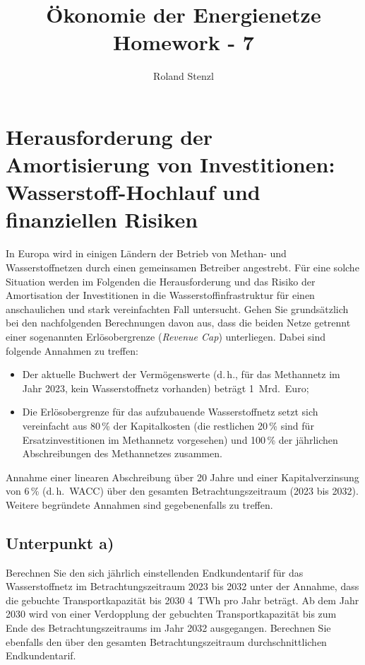 \documentclass[a4paper,12pt]{article}
\title{Ökonomie der Energienetze\\\large Homework - 7}
\author{Roland Stenzl}
\begin{document}
\maketitle

\vspace{0.5cm}

\section*{Herausforderung der Amortisierung von Investitionen:
	Wasserstoff-Hochlauf und finanziellen Risiken}


\begin{angabebox}
	In Europa wird in einigen Ländern der Betrieb von Methan- und Wasserstoffnetzen durch einen gemeinsamen Betreiber angestrebt. Für eine solche Situation werden im Folgenden die Herausforderung und das Risiko der Amortisation der Investitionen in die Wasserstoffinfrastruktur für einen anschaulichen und stark vereinfachten Fall untersucht. Gehen Sie grundsätzlich bei den nachfolgenden Berechnungen davon aus, dass die beiden Netze getrennt einer sogenannten Erlösobergrenze (\textit{Revenue Cap}) unterliegen. Dabei sind folgende Annahmen zu treffen:
	
	\begin{itemize}
		\item Der aktuelle Buchwert der Vermögenswerte (d.\,h., für das Methannetz im Jahr 2023, kein Wasserstoffnetz vorhanden) beträgt 1~Mrd.~Euro;
		\item Die Erlösobergrenze für das aufzubauende Wasserstoffnetz setzt sich vereinfacht aus 80\,\% der Kapitalkosten (die restlichen 20\,\% sind für Ersatzinvestitionen im Methannetz vorgesehen) und 100\,\% der jährlichen Abschreibungen des Methannetzes zusammen.
	\end{itemize}
	
	Annahme einer linearen Abschreibung über 20 Jahre und einer Kapitalverzinsung von 6\,\% (d.\,h.\ WACC) über den gesamten Betrachtungszeitraum (2023 bis 2032). Weitere begründete Annahmen sind gegebenenfalls zu treffen.
\end{angabebox}

\subsection*{Unterpunkt a)}

\begin{angabebox}
	Berechnen Sie den sich jährlich einstellenden Endkundentarif für das Wasserstoffnetz im Betrachtungszeitraum 2023 bis 2032 unter der Annahme, dass die gebuchte Transportkapazität bis 2030 4~TWh pro Jahr beträgt. Ab dem Jahr 2030 wird von einer Verdopplung der gebuchten Transportkapazität bis zum Ende des Betrachtungszeitraums im Jahr 2032 ausgegangen. Berechnen Sie ebenfalls den über den gesamten Betrachtungszeitraum durchschnittlichen Endkundentarif.
\end{angabebox}
\end{document}
